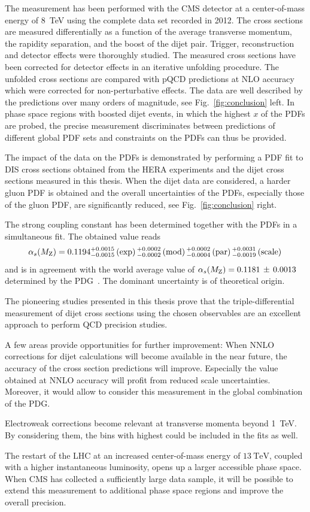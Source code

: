 The measurement has been performed with the CMS detector at a center-of-mass
energy of \SI{8}{\TeV} using the complete data set recorded in 2012. The cross
sections are measured differentially as a function of the average transverse
momentum, the rapidity separation, and the boost of the dijet pair. Trigger,
reconstruction and detector effects were thoroughly studied. The measured cross
sections have been corrected for detector effects in an iterative unfolding
procedure. The unfolded cross sections are compared with pQCD predictions at NLO
accuracy which were corrected for non-perturbative effects. The data are well
described by the predictions over many orders of magnitude, see
Fig.~\ref{fig:conclusion} left. In phase space regions with boosted dijet
events, in which the highest $x$ of the PDFs are probed, the precise measurement
discriminates between predictions of different global PDF sets and constraints
on the PDFs can thus be provided. 

The impact of the data on the PDFs is demonstrated by performing a PDF fit to
DIS cross sections obtained from the HERA experiments and the dijet cross sections measured
in this thesis. When the dijet data are considered, a harder gluon PDF is obtained
and the overall uncertainties of the PDFs, especially those of the gluon PDF,
are significantly reduced, see Fig.~\ref{fig:conclusion} right.

The strong coupling constant \asmz has been determined together with the PDFs in
a simultaneous fit. The obtained value reads
%
\begin{equation*}
    \alpha_{s}(M_\mathrm{Z}) = 0.1194_{-0.0015}^{+0.0015}\,(\mathrm{exp})\,
    {}_{-0.0002}^{+0.0002}\,(\mathrm{mod})\,{}_{-0.0004}^{+0.0002}\,(\mathrm{par})\,
    {}_{-0.0019}^{+0.0031}\,(\mathrm{scale})\,
\end{equation*}
%
and is in agreement with the world average value of $\alpha_{s}(M_\mathrm{Z}) = 0.1181 \,\pm\, 0.0013$
determined by the PDG~\cite{Agashe:2014kda}. The dominant uncertainty is of
theoretical origin.

The pioneering studies presented in this thesis prove that the triple-differential
measurement of dijet cross sections using the chosen observables are an
excellent approach to perform QCD precision studies.

A few areas provide opportunities for further improvement: When NNLO
corrections for dijet calculations will become available in the near future, the
accuracy of the cross section predictions will improve. Especially the \asmz
value obtained at NNLO accuracy will profit from reduced scale uncertainties.
Moreover, it would allow to consider this measurement in the global \asmz
combination of the PDG.

Electroweak corrections become relevant at transverse momenta beyond
\SI{1}{\TeV}. By considering them, the bins with highest \ptavg could be
included in the fits as well.

The restart of the LHC at an increased center-of-mass energy of $\SI{13}{\TeV}$,
coupled with a higher instantaneous luminosity, opens up a larger
accessible phase space. When CMS has collected a sufficiently large data sample,
it will be possible to extend this measurement to additional phase space regions
and improve the overall precision.

